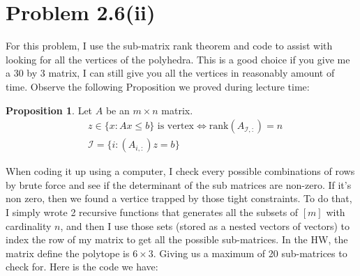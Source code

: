 \documentclass[]{article}
\theoremstyle{definition}
\newtheorem{prop}{Proposition}
\begin{document}
\section{Problem 2.6(ii)}
    For this problem, I use the sub-matrix rank theorem and code to assist with looking for all the vertices of the polyhedra. This is a good choice if you give me a 30 by 3 matrix, I can still give you all the vertices in reasonably amount of time. Observe the following Proposition we proved during lecture time: 
    \begin{prop}
        Let $A$ be an $m\times n$ matrix. 
        \begin{align}
            & z \in \{ x: Ax\le b \} \text{ is vertex} \iff 
            \text{rank}(A_{\mathcal I,:}) = n
            \\
            & \mathcal I = \{i: (A_{i, :})z = b\}
        \end{align}
    \end{prop}
    When coding it up using a computer, I check every possible combinations of rows by brute force and see if the determinant of the sub matrices are non-zero. If it's non zero, then we found a vertice trapped by those tight constraints. To do that, I simply wrote 2 recursive functions that generates all the subsets of $[m]$ with cardinality $n$, and then I use those sets (stored as a nested vectors of vectors) to index the row of my matrix to get all the possible sub-matrices. In the HW, the matrix define the polytope is $6\times 3$. Giving us a maximum of 20 sub-matrices to check for. Here is the code we have: 
\end{document}
